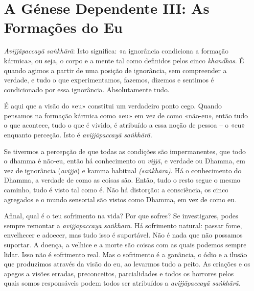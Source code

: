 \chapter{A Génese Dependente III: As Formações do Eu}

\emph{Avijjāpaccayā saṅkhārā}: Isto significa: «a ignorância condiciona a
formação kármica», ou seja, o corpo e a mente tal como definidos pelos cinco
\emph{khandhas}. É quando agimos a partir de uma posição de ignorância, sem
compreender a verdade, e tudo o que experimentamos, fazemos, dizemos e sentimos
é condicionado por essa ignorância. Absolutamente tudo.

É aqui que a visão do «eu» constitui um verdadeiro ponto cego. Quando pensamos
na formação kármica como «eu» em vez de como «não-eu», então tudo o que
acontece, tudo o que é vivido, é atribuído a essa noção de pessoa -- o «eu»
enquanto perceção. Isto é \emph{avijjāpaccayā saṅkhārā}.

Se tivermos a percepção de que todas as condições são impermanentes, que todo o
dhamma é não-eu, então há conhecimento ou \emph{vijjā}, e verdade ou Dhamma, em
vez de ignorância (\emph{avijjā}) e kamma habitual \emph{(saṅkhāra)}. Há o
conhecimento do Dhamma, a verdade de como as coisas são. Então, tudo o resto
segue o mesmo caminho, tudo é visto tal como é. Não há distorção: a consciência,
os cinco agregados e o mundo sensorial são vistos como Dhamma, em vez de como
eu.

Afinal, qual é o teu sofrimento na vida? Por que sofres? Se investigares, podes
sempre remontar a \emph{avijjāpaccayā saṅkhārā}. Há sofrimento natural: passar
fome, envelhecer e adoecer, mas tudo isso é suportável. Não é nada que não
possamos suportar. A doença, a velhice e a morte são coisas com as quais podemos
sempre lidar. Isso não é sofrimento real. Mas o sofrimento é a ganância, o ódio
e a ilusão que produzimos através da visão do eu, ao levarmos tudo a peito. As
criações e os apegos a visões erradas, preconceitos, parcialidades e todos os
horrores pelos quais somos responsáveis podem todos ser atribuídos a
\emph{avijjāpaccayā saṅkhārā}.

